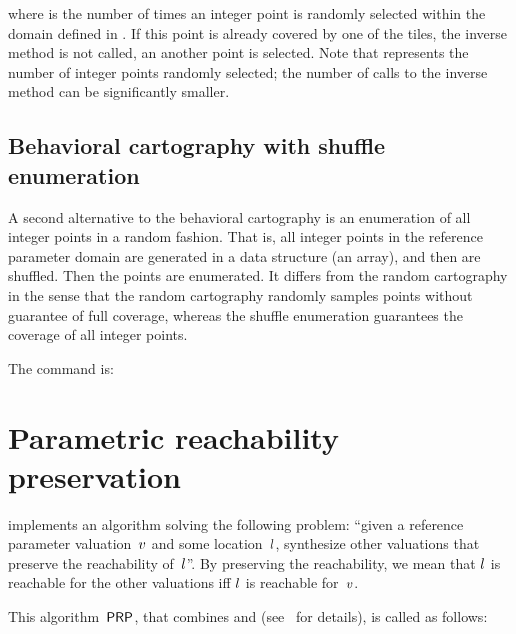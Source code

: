 \noindent{}where  is the number of times an integer point is randomly selected within the domain defined in .
If this point is already covered by one of the tiles, the inverse method is not called, an another point is selected.
Note that  represents the number of integer points randomly selected; the number of calls to the inverse method can be significantly smaller.


\subsection*{Behavioral cartography with shuffle enumeration}\label{sss:mode:BC:shuffle}

A second alternative to the behavioral cartography is an enumeration of all integer points in a random fashion.
That is, all integer points in the reference parameter domain are generated in a data structure (an array), and then are shuffled.
Then the points are enumerated.
It differs from the random cartography in the sense that the random cartography randomly samples points without guarantee of full coverage, whereas the shuffle enumeration guarantees the coverage of all integer points.

The command is:



\section{Parametric reachability preservation}\label{ss:mode:PRP}

\imitator{} implements an algorithm solving the following problem:
``given a reference parameter valuation~$v$ and some location~$l$, synthesize other valuations that preserve the reachability of~$l$''.
By preserving the reachability, we mean that $l$ is reachable for the other valuations iff $l$ is reachable for~$v$.

This algorithm~$\mathsf{PRP}$, that combines \EFsynth{} and \IM{} (see~\cite{ALNS15} for details), is called as follows:


